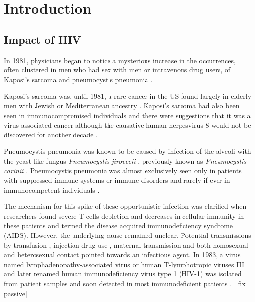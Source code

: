 \documentclass[../sherrill-Mix_thesis.tex]{subfiles}
\begin{document}
\graphicspath{{im/}{intro/im/}}
\chapter{Introduction}
\section{Impact of HIV}
	In 1981, physicians began to notice a mysterious increase in the occurrences, often clustered in men who had sex with men or intravenous drug users, of Kaposi's sarcoma and pneumocystis pneumonia \citep{Gottlieb1981,Friedman-Kien1981,Hymes1981,Masur1981,Siegal1981,Gottlieb1981a}. 
	
	Kaposi's sarcoma was, until 1981, a rare cancer in the US found largely in elderly men with Jewish or Mediterranean ancestry \citep{Laor1979}. Kaposi's sarcoma had also been seen in immunocompromised individuals \citep{Klein1974,Myers1974,Kapadia1977} and there were suggestions that it was a virus-associated cancer \citep{Safai1981} although the causative human herpesvirus 8 would not be discovered for another decade \citep{Chang1994,Sitas1999}. 
	
	Pneumocystis pneumonia was known to be caused by infection of the alveoli with the yeast-like fungus \emph{Pneumocystis jirovecii} \citep{Burke1973,Hughes1977}, previously known as \emph{Pneumocystis carinii} \citep{Stringer2009}. Pneumocystis pneumonia was almost exclusively seen only in patients with suppressed immune systems or immune disorders and rarely if ever in immunocompetent individuals \citep{Hughes1977}.

	The mechanism for this spike of these opportunistic infection was clarified when researchers found severe T cells depletion and decreases in cellular immunity in these patients \citep{Masur1981,Siegal1981,Gottlieb1981a,Gerstoft1982,Masur1982} and termed the disease acquired immunodeficiency syndrome (AIDS). However, the underlying cause remained unclear. Potential transmissions by transfusion \citep{Ammann1982,Ehrenkranz1982,Poon1982}, injection drug use \citep{Masur1981,Masur1982,Greene1982}, maternal transmission \citep{OReilly1982} and both homosexual \citep{Fannin1982,Gerstoft1982} and heterosexual \citep{Masur1982,Harris1983} contact pointed towards an infectious agent. In 1983, a virus named lymphadenopathy-associated virus or human T-lymphotropic viruses III and later renamed human immunodeficiency virus type 1 (HIV-1) was isolated from patient samples \citep{Barre-Sinoussi1983,Gallo1983,Popovic1984,Levy1984} and soon detected in most immunodeficient patients \citep{Gallo1984,Sarngadharan1984,Safai1984,Levy1984}.  [[fix passive]]
\end{document}
